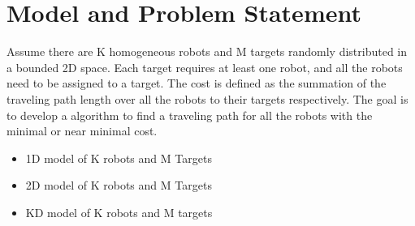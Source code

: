 \section{Model and Problem Statement}
Assume there are K homogeneous robots and M targets randomly distributed in a bounded 2D space. Each target requires at least one robot, and all the robots need to be assigned to a target. The cost is defined as the summation of the traveling path length over all the robots to their targets respectively. The goal is to develop a algorithm to find a traveling path for all the robots with the minimal or near minimal cost.
\begin{itemize}
    \item 1D model of K robots and M Targets
    \item 2D model of K robots and M Targets
    \item KD model of K robots and M targets
\end{itemize}



